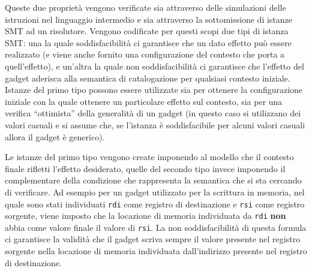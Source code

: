 Queste due proprietà vengono verificate sia attraverso delle
simulazioni delle istruzioni nel linguaggio intermedio e sia
attraverso la sottomissione di istanze SMT ad un risolutore. Vengono
codificate per questi scopi due tipi di istanza SMT: una la quale
soddisfacibilità ci garantisce che un dato effetto può essere
realizzato (e viene anche fornito una configurazione del contesto che
porta a quell'effetto), e un'altra la quale non soddisfacibilità ci
garantisce che l'effetto del gadget aderisca alla semantica di
catalogazione per qualsiasi contesto iniziale. Istanze del primo tipo
possono essere utilizzate sia per ottenere la configurazione iniziale
con la quale ottenere un particolare effetto sul contesto, sia per una
verifica ``ottimista'' della generalità di un gadget (in questo caso
si utilizzano dei valori casuali e si assume che, se l'istanza è
soddisfacibile per alcuni valori casuali allora il gadget è generico).

Le istanze del primo tipo vengono create imponendo al modello che il
contesto finale rifletti l'effetto desiderato, quelle del secondo tipo
invece imponendo il complementare della condizione che rappresenta la
semantica che si sta cercando di verificare. Ad esempio per un gadget
utilizzato per la scrittura in memoria, nel quale sono stati
individuati \lstinline{rdi} come registro di destinazione e
\lstinline{rsi} come registro sorgente, viene imposto che la locazione
di memoria individuata da \lstinline{rdi} \textbf{non} abbia come
valore finale il valore di \lstinline{rsi}. La non soddisfacibilità di
questa formula ci garantisce la validità che il gadget scriva sempre
il valore presente nel registro sorgente nella locazione di memoria
individuata dall'indirizzo presente nel registro di destinazione.


